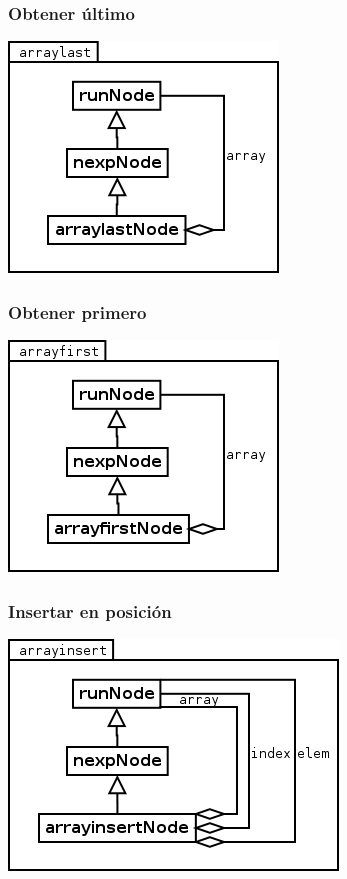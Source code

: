 \subsubsection {Obtener último}
\begin{center}
\includegraphics[scale=0.4]{last.png} \\
\end{center}

\subsubsection {Obtener primero}
\begin{center}
\includegraphics[scale=0.4]{first.png} \\
\end{center}

\subsubsection {Insertar en posición}
\begin{center}
\includegraphics[scale=0.4]{insert.png} \\
\end{center}

